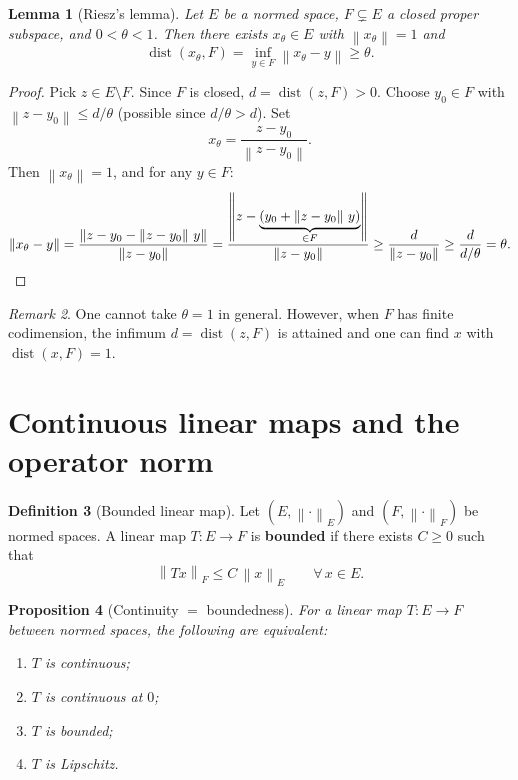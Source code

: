 \documentclass[a4paper,12pt]{book}
\DeclareMathOperator{\dist}{dist}
\newcommand{\norm}[1]{\left\| #1 \right\|}
\theoremstyle{definition}
\newtheorem{definition}{Definition}[chapter]
\theoremstyle{plain}
\newtheorem{proposition}[definition]{Proposition}
\newtheorem{lemma}[definition]{Lemma}
\theoremstyle{remark}
\newtheorem{remark}[definition]{Remark}
\begin{document}
\begin{lemma}[Riesz's lemma]
\label{lem:riesz}
Let $E$ be a normed space, $F\subsetneq E$ a \emph{closed} proper subspace,
and $0<\theta<1$.  Then there exists $x_\theta\in E$ with
$\norm{x_\theta}=1$ and
\[
  \dist(x_\theta,F) = \inf_{y\in F}\norm{x_\theta-y} \ge \theta.
\]
\end{lemma}

\begin{proof}
Pick $z\in E\setminus F$.  Since $F$ is closed,
$d = \dist(z,F) > 0$.  Choose $y_0\in F$ with
$\norm{z-y_0}\le d/\theta$ (possible since $d/\theta > d$).
Set
\[
  x_\theta = \frac{z-y_0}{\norm{z-y_0}}.
\]
Then $\norm{x_\theta}=1$, and for any $y\in F$:
\[
  \norm{x_\theta - y}
  = \frac{\norm{z - y_0 - \norm{z-y_0}\,y}}{\norm{z-y_0}}
  = \frac{\norm{z - \underbrace{(y_0+\norm{z-y_0}\,y)}_{\in F}}}{\norm{z-y_0}}
  \ge \frac{d}{\norm{z-y_0}}
  \ge \frac{d}{d/\theta} = \theta. \qedhere
\]
\end{proof}

\begin{remark}
One cannot take $\theta=1$ in general.  However, when $F$ has finite
codimension, the infimum $d=\dist(z,F)$ is attained and
one can find $x$ with $\dist(x,F)=1$.
\end{remark}

\section{Continuous linear maps and the operator norm}
\label{sec:continuous-linear}

\begin{definition}[Bounded linear map]
\label{def:bounded-linear}
Let $(E,\norm{\cdot}_E)$ and $(F,\norm{\cdot}_F)$ be normed spaces.
A linear map $T:E\to F$ is \textbf{bounded} if there exists $C\ge 0$ such
that
\[
  \norm{Tx}_F \le C\,\norm{x}_E \qquad\forall\,x\in E.
\]
\end{definition}

\begin{proposition}[Continuity $=$ boundedness]
\label{prop:cont-iff-bounded}
For a linear map $T:E\to F$ between normed spaces, the following are
equivalent:
\begin{enumerate}[label=\textup{(\roman*)}]
  \item $T$ is continuous;
  \item $T$ is continuous at $0$;
  \item $T$ is bounded;
  \item $T$ is Lipschitz.
\end{enumerate}
\end{proposition}
\end{document}
